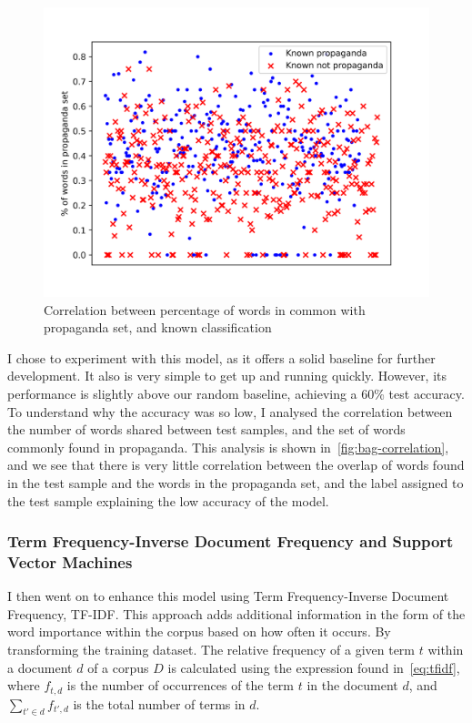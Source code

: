 \documentclass[twocolumn]{article}
\begin{document}
\begin{figure}[ht]
    \centering 
    \includegraphics[scale=0.5]{../assets/bag-of-words-correlation.png}
    \caption{Correlation between percentage of words in common with propaganda set, and known classification}
    \label{fig:bag-correlation}
\end{figure}

I chose to experiment with this model, as it offers a solid baseline for further development. It also is very simple to get up and running quickly. However, its performance is slightly above our random baseline, achieving a 60\% test accuracy. To understand why the accuracy was so low, I analysed the correlation between the number of words shared between test samples, and the set of words commonly found in propaganda. This analysis is shown in~\autoref{fig:bag-correlation}, and we see that there is very little correlation between the overlap of words found in the test sample and the words in the propaganda set, and the label assigned to the test sample explaining the low accuracy of the model. 

\subsubsection{Term Frequency-Inverse Document Frequency and Support Vector Machines}

I then went on to enhance this model using Term Frequency-Inverse Document Frequency, TF-IDF. This approach adds additional information in the form of the word importance within the corpus based on how often it occurs. By transforming the training dataset. The relative frequency of a given term $t$ within a document $d$ of a corpus $D$ is calculated using the expression found in~\autoref{eq:tfidf}, where $f_{t, d}$ is the number of occurrences of the term $t$ in the document $d$, and $\sum_{t'\in d} f_{t', d}$ is the total number of terms in $d$.
\end{document}
